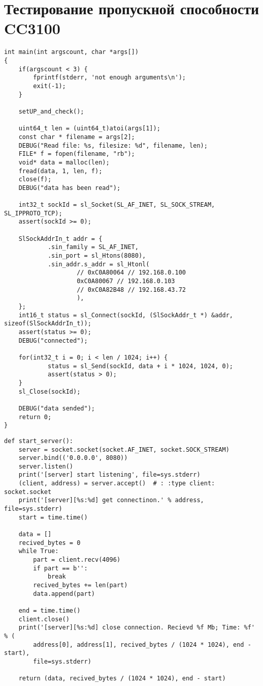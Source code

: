 \chapter{Тестирование пропускной способности CC3100}
\label{cha:impl}


\begin{verbatim}
int main(int argscount, char *args[])
{
    if(argscount < 3) {
        fprintf(stderr, 'not enough arguments\n');
        exit(-1);
    }

    setUP_and_check();

    uint64_t len = (uint64_t)atoi(args[1]);
    const char * filename = args[2];
    DEBUG("Read file: %s, filesize: %d", filename, len);
    FILE* f = fopen(filename, "rb");
    void* data = malloc(len);
    fread(data, 1, len, f);
    close(f);
    DEBUG("data has been read");

    int32_t sockId = sl_Socket(SL_AF_INET, SL_SOCK_STREAM, SL_IPPROTO_TCP);
    assert(sockId >= 0);

    SlSockAddrIn_t addr = {
            .sin_family = SL_AF_INET,
            .sin_port = sl_Htons(8080),
            .sin_addr.s_addr = sl_Htonl(
                    // 0xC0A80064 // 192.168.0.100
                    0xC0A80067 // 192.168.0.103
                    // 0xC0A82B48 // 192.168.43.72
                    ),
    };
    int16_t status = sl_Connect(sockId, (SlSockAddr_t *) &addr, sizeof(SlSockAddrIn_t));
    assert(status >= 0);
    DEBUG("connected");

    for(int32_t i = 0; i < len / 1024; i++) {
            status = sl_Send(sockId, data + i * 1024, 1024, 0);
            assert(status > 0);
    }
    sl_Close(sockId);

    DEBUG("data sended");
    return 0;
}
\end{verbatim}

\begin{verbatim}
def start_server():
    server = socket.socket(socket.AF_INET, socket.SOCK_STREAM)
    server.bind(('0.0.0.0', 8080))
    server.listen()
    print('[server] start listening', file=sys.stderr)
    (client, address) = server.accept()  # : :type client: socket.socket
    print('[server][%s:%d] get connectinon.' % address, file=sys.stderr)
    start = time.time()

    data = []
    recived_bytes = 0
    while True:
        part = client.recv(4096)
        if part == b'':
            break
        recived_bytes += len(part)
        data.append(part)

    end = time.time()
    client.close()
    print('[server][%s:%d] close connection. Recievd %f Mb; Time: %f' % (
        address[0], address[1], recived_bytes / (1024 * 1024), end - start),
        file=sys.stderr)

    return (data, recived_bytes / (1024 * 1024), end - start)
\end{verbatim}


